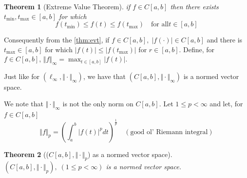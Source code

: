 \documentclass[11pt, oneside]{book}
\theoremstyle{break}
\newtheorem{thm}{Theorem}[section]
\begin{document}
\begin{thm}[Extreme Value Theorem]\label{thm:evt}
	if $f \in C[a,b]$ then there exists $t_{\min}, t_{\max} \in [a, b]$ for which
	\begin{equation}
		f(t_{\min}) \leq f(t) \leq f(t_{\max}) \quad \text{for all} t \in [a, b]
	\end{equation}
\end{thm}

Consequently from the \autoref{thm:evt}, if $f \in C[a, b], \; |f(\cdot)| \in C[a, b]$ and there is $t_{\max} \in [a, b]$ for which $|f(t)| \leq |f(t_{\max})|$ for $r \in [a, b]$. Define, for $f \in C[a,b]$, $\Vert f\Vert _\infty = \max_{t \in [a,b]} |f(t)|$.

Just like for $(\ell_\infty, \Vert \cdot\Vert _\infty)$, we have that $(C[a,b], \Vert \cdot\Vert _\infty)$ is a normed vector space.

We note that $\Vert \cdot\Vert _\infty$ is not the only norm on $C[a,b]$. Let $1 \leq p < \infty$ and let, for $f \in C[a, b]$
\begin{equation}
	\Vert f\Vert _p = \left( \int_{a}^{b} |f(t)|^p dt \right)^{\frac{1}{p}} \quad (\text{good ol' Riemann integral})
\end{equation}

\begin{thm}[(\texorpdfstring{$C[a, b], \Vert \cdot\Vert _p$}{}) as a normed vector space]
	$(C[a,b], \Vert \cdot\Vert _p), \; (1 \leq p < \infty)$ is a normed vector space.
\end{thm}
\end{document}
